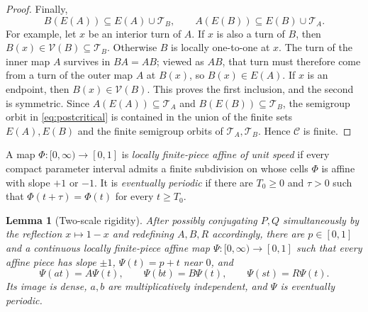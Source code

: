 \documentclass[11pt]{article}
\newtheorem{lemma}[theorem]{Lemma}
\newcommand{\I}{[0,1]}
\begin{document}
\begin{proof}
Finally,
\begin{equation}\label{eq:turn-transport}
B(E(A))\subseteq E(A)\cup\mathcal T_B,
\qquad
A(E(B))\subseteq E(B)\cup\mathcal T_A.
\end{equation}
For example, let $x$ be an interior turn of $A$. If $x$ is also a turn of $B$, then
$B(x)\in\mathcal V(B)\subseteq\mathcal T_B$. Otherwise $B$ is locally one-to-one at $x$. The turn of
the inner map $A$ survives in $BA=AB$; viewed as $AB$, that turn must therefore come from a turn of
the outer map $A$ at $B(x)$, so $B(x)\in E(A)$. If $x$ is an endpoint, then
$B(x)\in\mathcal V(B)$. This proves the first inclusion, and the second is symmetric. Since
$A(E(A))\subseteq\mathcal T_A$ and $B(E(B))\subseteq\mathcal T_B$, the semigroup orbit in
\eqref{eq:postcritical} is contained in the union of the finite sets $E(A),E(B)$ and the finite semigroup
orbits of $\mathcal T_A,\mathcal T_B$. Hence $\mathcal C$ is finite.
\end{proof}

A map $\Phi:[0,\infty)\to\I$ is \emph{locally finite-piece affine of unit speed} if every compact
parameter interval admits a finite subdivision on whose cells $\Phi$ is affine with slope $+1$ or
$-1$. It is \emph{eventually periodic} if there are $T_0\geq0$ and $\tau>0$ such that
$\Phi(t+\tau)=\Phi(t)$ for every $t\geq T_0$.

\begin{lemma}[Two-scale rigidity]\label{lem:two-scale}
After possibly conjugating $P,Q$ simultaneously by the reflection $x\mapsto1-x$ and redefining
$A,B,R$ accordingly, there are $p\in\I$ and a continuous locally finite-piece affine map
$\Psi:[0,\infty)\to\I$ such that every affine piece has slope $\pm1$, $\Psi(t)=p+t$ near $0$, and
\begin{equation}\label{eq:equivariance}
\Psi(at)=A\Psi(t),\qquad \Psi(bt)=B\Psi(t),\qquad \Psi(st)=R\Psi(t).
\end{equation}
Its image is dense, $a,b$ are multiplicatively independent, and $\Psi$ is eventually periodic.
\end{lemma}
\end{document}
